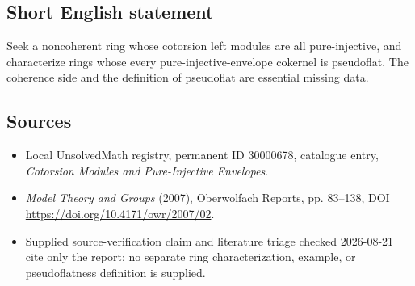 \documentclass[11pt]{article}
\begin{document}
\subsection{Short English statement}
Seek a noncoherent ring whose cotorsion left modules are all pure-injective, and characterize rings whose every pure-injective-envelope cokernel is pseudoflat. The coherence side and the definition of pseudoflat are essential missing data.
\subsection{Sources}
\begin{itemize}
\item Local UnsolvedMath registry, permanent ID 30000678, catalogue entry, \emph{Cotorsion Modules and Pure-Injective Envelopes}.
\item \emph{Model Theory and Groups} (2007), Oberwolfach Reports, pp. 83--138, DOI \url{https://doi.org/10.4171/owr/2007/02}.
\item Supplied source-verification claim and literature triage checked 2026-08-21 cite only the report; no separate ring characterization, example, or pseudoflatness definition is supplied.
\end{itemize}
\end{document}
